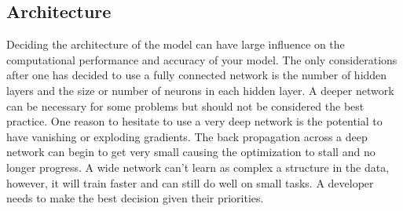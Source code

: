 \documentclass[10pt]{amsart}
\begin{document}
\subsection{Architecture}
Deciding the architecture of the model can have large influence on the computational performance and accuracy of your model.
The only considerations after one has decided to use a fully connected network is the number of hidden layers and the size or number of neurons in each hidden layer.
A deeper network can be necessary for some problems but should not be considered the best practice.
One reason to hesitate to use a very deep network is the potential to have vanishing or exploding gradients.
The back propagation across a deep network can begin to get very small causing the optimization to stall and no longer progress.
A wide network can't learn as complex a structure in the data, however, it will train faster and can still do well on small tasks.
A developer needs to make the best decision given their priorities.
\end{document}
